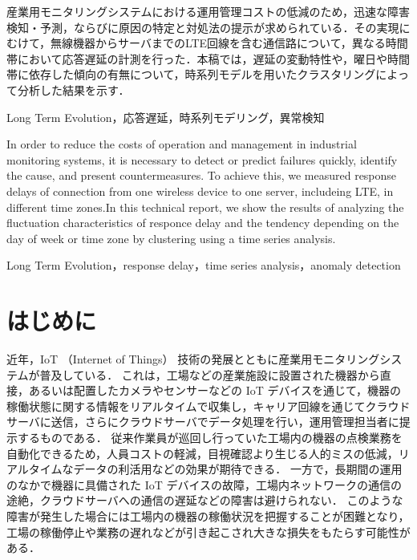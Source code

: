 \documentclass[technicalreport]{ieicej}
\begin{document}
\newcommand{\argmin}{\mathop{\rm arg~min}\limits}
\def \vector#1{\mbox{\boldmath $#1$}}

\begin{jabstract}
産業用モニタリングシステムにおける運用管理コストの低減のため，迅速な障害検知・予測，ならびに原因の特定と対処法の提示が求められている．その実現にむけて，無線機器からサーバまでのLTE回線を含む通信路について，異なる時間帯において応答遅延の計測を行った．本稿では，遅延の変動特性や，曜日や時間帯に依存した傾向の有無について，時系列モデルを用いたクラスタリングによって分析した結果を示す．
\end{jabstract}
\begin{jkeyword}
Long Term Evolution，応答遅延，時系列モデリング，異常検知
\end{jkeyword}
\begin{eabstract}
In order to reduce the costs of operation and management in industrial monitoring systems, it is necessary to detect or predict failures quickly, identify the cause, and present countermeasures. To achieve this, we measured response delays of connection from one wireless device to one server, includeing LTE, in different time zones.In this technical report, we show the results of analyzing the fluctuation characteristics of responce delay and the tendency depending on the day of week or time zone by clustering using a time series analysis.
\end{eabstract}
\begin{ekeyword}
Long Term Evolution，response delay，time series analysis，anomaly detection
\end{ekeyword}
\maketitle

\section{はじめに}
近年，IoT （Internet of Things） 技術の発展とともに産業用モニタリングシステム\cite{monitering}が普及している．
これは，工場などの産業施設に設置された機器から直接，あるいは配置したカメラやセンサーなどの IoT デバイスを通じて，機器の稼働状態に関する情報をリアルタイムで収集し，キャリア回線を通じてクラウドサーバに送信，さらにクラウドサーバでデータ処理を行い，運用管理担当者に提示するものである．
従来作業員が巡回し行っていた工場内の機器の点検業務を自動化できるため，人員コストの軽減，目視確認より生じる人的ミスの低減，リアルタイムなデータの利活用などの効果が期待できる．
一方で，長期間の運用のなかで機器に具備された IoT デバイスの故障，工場内ネットワークの通信の途絶，クラウドサーバへの通信の遅延などの障害は避けられない．
このような障害が発生した場合には工場内の機器の稼働状況を把握することが困難となり，工場の稼働停止や業務の遅れなどが引き起こされ大きな損失をもたらす可能性がある．
\end{document}

